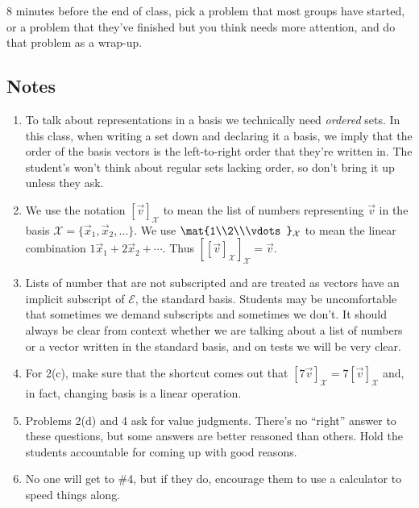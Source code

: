 	8 minutes before the end of class, pick a problem that most groups have started, or a problem
		that they've finished but you think needs more attention, and do that problem as a wrap-up.


\subsection*{Notes}
		\begin{enumerate}
			\item To talk about representations in a basis we technically need \emph{ordered} sets. In this class,
				when writing a set down and declaring it a basis, we imply that the order of the basis vectors
				is the left-to-right order that they're written in. The student's won't think about regular sets lacking
				order,
				so don't bring it up unless they ask.
			\item We use the notation $[\vec v]_{\mathcal X}$ to mean the list of numbers representing
				$\vec v$ in the basis $\mathcal X=\{\vec x_1,\vec x_2,\ldots\}$. We use $\mat{1\\2\\\vdots}_{\mathcal X}$ to
				mean the linear combination $1\vec x_1+2\vec x_2+\cdots$. Thus $[[\vec v]_{\mathcal X}]_{\mathcal X}=\vec v$.
			\item Lists of number that are not subscripted and are treated as vectors have an implicit
				subscript of $\mathcal E$, the standard basis. Students may be uncomfortable
				that sometimes we demand subscripts and sometimes we don't. It should always be clear from context
				whether we are talking about a list of numbers or a vector written in the standard basis, and on
				tests we will be very clear.
			\item For 2(c), make sure that the shortcut comes out that $[7\vec v]_{\mathcal X} = 7[\vec v]_{\mathcal X}$ and,
				in fact, changing basis is a linear operation.
			\item Problems 2(d) and 4 ask for value judgments. There's no ``right'' answer to these questions, but
				some answers are better reasoned than others. Hold the students accountable for coming
				up with good reasons.
			\item No one will get to \#4, but if they do, encourage them to use a calculator to speed things along.
		\end{enumerate}